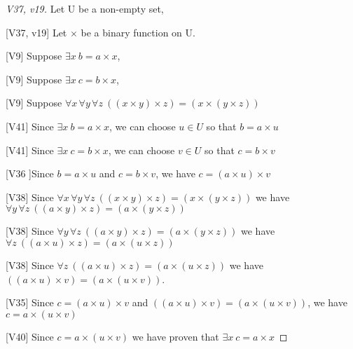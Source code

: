 \begin{proof}
[V37, v19] Let U be a non-empty set,

[V37, v19] Let $\times$ be a binary function on U.

[V9] Suppose $\exists x \ b = a\times x$,

[V9] Suppose $\exists x \ c=b\times x$,

[V9] Suppose $\forall x \, \forall y \, \forall z \ ((x\times y)\times z) = (x\times (y\times z))$



[V41] Since $\exists x \ b = a\times x$, we can choose $u\in U$ so that $b = a\times u$

[V41] Since $\exists x \ c = b\times x$, we can choose $v\in U$ so that $c = b\times v$

[V36 ]Since $b = a\times u$ and $c = b\times v$, we have $c= (a\times u) \times v$

[V38] Since $\forall x \, \forall y \, \forall z \ ((x\times y)\times z) = (x\times (y\times z))$ we have $\forall y \, \forall z \ ((a\times y)\times z) = (a\times (y\times z))$

[V38] Since $\forall y \, \forall z \ ((a\times y)\times z) = (a\times (y\times z))$ we have $\forall z \ ((a\times u)\times z) = (a\times (u\times z))$

[V38] Since $\forall z \ ((a\times u)\times z) = (a\times (u\times z))$ we have $ ((a\times u)\times v) = (a\times (u\times v))$.

[V35] Since $c = (a\times u) \times v$ and $ ((a\times u)\times v) = (a\times (u\times v))$, we have $c = a\times (u\times v)$

[V40] Since $c = a\times (u\times v)$ we have proven that $\exists x \ c = a \times x$

\end{proof}




